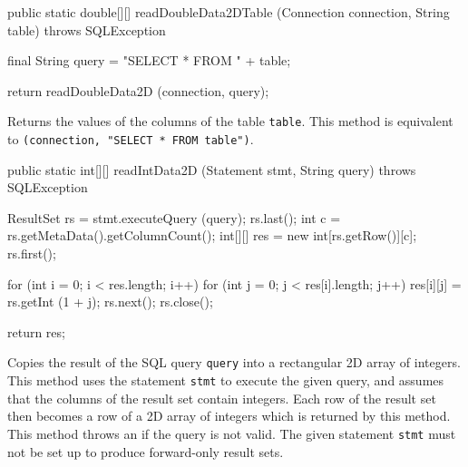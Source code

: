 \begin{code}

   public static double[][] readDoubleData2DTable (Connection connection,
                                                   String table)
            throws SQLException\begin{hide} {
        final String query = "SELECT * FROM " + table;
        
        return readDoubleData2D (connection, query);
    }\end{hide}
\end{code}
\begin{tabb}
   Returns the values of the columns of the table \texttt{table}.
   This method is equivalent to 
   \texttt{(connection, "SELECT * FROM table")}.
\end{tabb}
\begin{code}

   public static int[][] readIntData2D (Statement stmt, String query)
            throws SQLException\begin{hide} {
      ResultSet rs = stmt.executeQuery (query);
      rs.last();
      int c = rs.getMetaData().getColumnCount();
      int[][] res = new int[rs.getRow()][c];
      rs.first();
        
      for (int i = 0; i < res.length; i++) {
         for (int j = 0; j < res[i].length; j++)
            res[i][j] = rs.getInt (1 + j);
         rs.next();
      }
      rs.close();
            
      return res;
   }\end{hide}
\end{code}
\begin{tabb}
   Copies the result of the SQL query \texttt{query} into a
   rectangular 2D array of integers.
   This method uses the statement \texttt{stmt} to execute the given query, and
   assumes that the columns of the result set contain integers.
   Each row of the result set then becomes a row of a 2D array of integers
   which is returned by this method.
    This method throws an  if the query is not valid.
   The given statement \texttt{stmt} must not be set up to
   produce forward-only result sets.
\end{tabb}
\begin{htmlonly}
\end{htmlonly}
